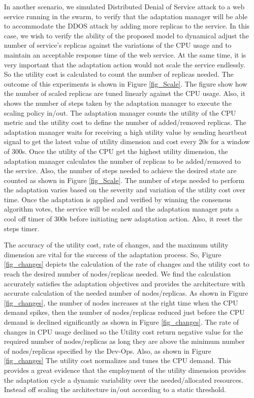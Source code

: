 \documentclass[sigconf]{acmart}
\begin{document}
In another scenario, we simulated Distributed Denial of Service attack to a web service running in the swarm, to verify that the adaptation manager will be able to accommodate the DDOS attack by adding more replicas to the service. In this case, we wish to verify the ability of the proposed model to dynamical adjust the number of service's replicas against the variations of the CPU usage and to maintain an acceptable response time of the web service. At the same time, it is very important that the adaptation action would not scale the service endlessly. So the utility cost is calculated to count the number of replicas needed. The outcome of this experiments is shown in Figure \ref{fig_Scale}. The figure show how the number of scaled replicas are tuned linearly against the CPU usage. Also, it shows the number of steps taken by the adaptation manager to execute the scaling policy in/out. The adaptation manager counts the utility of the CPU metric and the utility cost to define the number of added/removed replicas. The adaptation manager waits for receiving a high utility value by sending heartbeat signal to get the latest value of utility dimension and cost every 20s for a window of 300s. Once the utility of the CPU get the highest utility dimension, the adaptation manager calculates the number of replicas to be added/removed to the service. Also, the number of steps needed to achieve the desired state are counted as shown in Figure \ref{fig_Scale}. The number of steps needed to perform the adaptation varies based on the severity and variation of the utility cost over time. Once the adaptation is applied and verified by winning the consensus algorithm votes, the service will be scaled and the adaptation manager puts a cool off timer of 300s before initiating new adaptation action. Also, it reset the steps timer. 

The accuracy of the utility cost, rate of changes, and the maximum utility dimension are vital for the success of the adaptation process. So, Figure \ref{fig_changes} depicts the calculation of the rate of changes and the utility cost to reach the desired number of nodes/replicas needed. We find the calculation accurately satisfies the adaptation objectives and provides the architecture with accurate calculation of the needed number of nodes/replicas. As shown in Figure \ref{fig_changes}, the number of nodes increases at the right time when the CPU demand spikes, then the number of nodes/replicas reduced just before the CPU demand is declined significantly as shown in Figure \ref{fig_changes}. The rate of changes in CPU usage declined so the Utility cost return negative value for the required number of nodes/replicas as long they are above the minimum number of nodes/replicas specified by the Dev-Ops. Also, as shown in Figure \ref{fig_changes} The utility cost normalizes and tunes the CPU demand. This provides a great evidence that the employment of the utility dimension provides the adaptation cycle a dynamic variability over the needed/allocated resources. Instead off scaling the architecture in/out according to a static threshold. 
\end{document}
